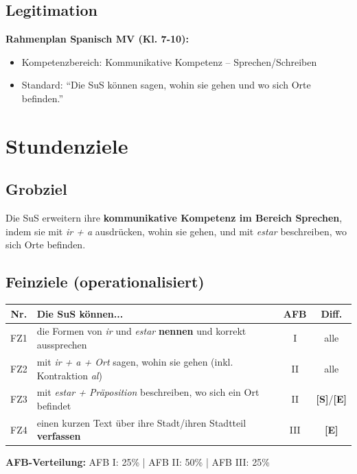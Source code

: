 \documentclass[11pt,a4paper]{article}
\newcommand{\Std}{\textcolor{standard}{\textbf{[S]}}}
\newcommand{\E}{\textcolor{erweiterung}{\textbf{[E]}}}
\begin{document}
\subsection{Legitimation}
\textbf{Rahmenplan Spanisch MV (Kl. 7-10):}
\begin{itemize}
    \item Kompetenzbereich: Kommunikative Kompetenz -- Sprechen/Schreiben
    \item Standard: ``Die SuS können sagen, wohin sie gehen und wo sich Orte befinden.''
\end{itemize}

\section{Stundenziele}

\subsection{Grobziel}
Die SuS erweitern ihre \textbf{kommunikative Kompetenz im Bereich Sprechen}, indem sie mit \textit{ir + a} ausdrücken, wohin sie gehen, und mit \textit{estar} beschreiben, wo sich Orte befinden.

\subsection{Feinziele (operationalisiert)}
\begin{tabular}{|c|p{7.5cm}|c|c|}
\hline
\textbf{Nr.} & \textbf{Die SuS können...} & \textbf{AFB} & \textbf{Diff.} \\
\hline
FZ1 & die Formen von \textit{ir} und \textit{estar} \textbf{nennen} und korrekt aussprechen & I & alle \\
\hline
FZ2 & mit \textit{ir + a + Ort} sagen, wohin sie gehen (inkl. Kontraktion \textit{al}) & II & alle \\
\hline
FZ3 & mit \textit{estar + Präposition} beschreiben, wo sich ein Ort befindet & II & \Std{}/\E{} \\
\hline
FZ4 & einen kurzen Text über ihre Stadt/ihren Stadtteil \textbf{verfassen} & III & \E{} \\
\hline
\end{tabular}

\vspace{1em}
\textbf{AFB-Verteilung:} AFB I: 25\% | AFB II: 50\% | AFB III: 25\%
\end{document}
